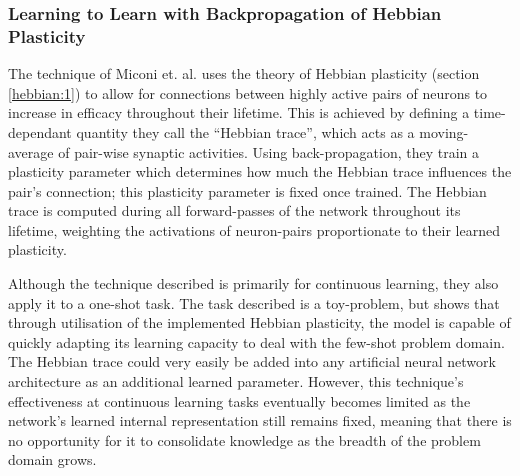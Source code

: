\documentclass{report}
\begin{document}
\subsubsection{Learning to Learn with Backpropagation of Hebbian Plasticity}
The technique of Miconi et. al. \parencite{ltlwbohb} uses the theory of Hebbian plasticity (section \ref{hebbian:1}) to allow for connections between highly active pairs of neurons to increase in efficacy throughout their lifetime. This is achieved by defining a time-dependant quantity they call the ``Hebbian trace'', which acts as a moving-average of pair-wise synaptic activities. Using back-propagation, they train a plasticity parameter which determines how much the Hebbian trace influences the pair's connection; this plasticity parameter is fixed once trained. The Hebbian trace is computed during all forward-passes of the network throughout its lifetime, weighting the activations of neuron-pairs proportionate to their learned plasticity. \par
Although the technique described is primarily for continuous learning, they also apply it to a one-shot task. The task described is a toy-problem, but shows that through utilisation of the implemented Hebbian plasticity, the model is capable of quickly adapting its learning capacity to deal with the few-shot problem domain. The Hebbian trace could very easily be added into any artificial neural network architecture as an additional learned parameter. However, this technique's effectiveness at continuous learning tasks eventually becomes limited as the network's learned internal representation still remains fixed, meaning that there is no opportunity for it to consolidate knowledge as the breadth of the problem domain grows. \par
\end{document}
